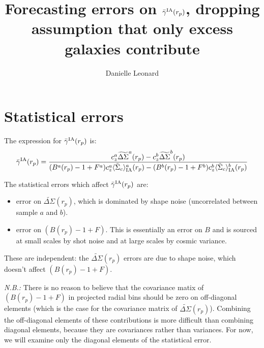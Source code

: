 \documentclass[onecolumn,amsmath,aps,fleqn, superscriptaddress]{revtex4}
\begin{document}
\title{Forecasting errors on $\bar{\gamma}^{\rm IA}(r_p)$, dropping assumption that only excess galaxies contribute}

\author{Danielle Leonard}

\maketitle

\section{Statistical errors}

The expression for $\bar{\gamma}^{\rm IA}(r_p)$ is:
\begin{equation}
\bar{\gamma}^{\rm IA}(r_p) = \frac{c_z^a \widetilde{\Delta\Sigma}^a(r_p) - c_z^b \widetilde{\Delta\Sigma}^b(r_p)}{(B^a(r_p)-1+F^a)c_z^a \langle \tilde{\Sigma}_c\rangle_{\rm IA}^a(r_p) -(B^b(r_p)-1+F^b)c_z^b \langle \tilde{\Sigma}_c\rangle_{\rm IA}^b(r_p)}
\label{gamma_sol_oct26}
\end{equation}

The statistical errors which affect $\bar{\gamma}^{\rm IA}(r_p)$ are:
\begin{itemize}
\item{error on $\widetilde{\Delta\Sigma}(r_p)$, which is dominated by shape noise (uncorrelated between sample $a$ and $b$).}
\item{error on $(B(r_p)-1+F)$. This is essentially an error on $B$ and is sourced at small scales by shot noise and at large scales by cosmic variance.}
\end{itemize}
These are independent: the $\widetilde{\Delta\Sigma}(r_p)$ errors are due to shape noise, which doesn't affect $(B(r_p)-1+F)$.

{\it N.B.:} There is no reason to believe that the covariance matix of $(B(r_p)-1+F)$ in projected radial bins should be zero on off-diagonal elements (which is the case for the covariance matrix of $\widetilde{\Delta\Sigma}(r_p)$). Combining the off-diagonal elements of these contributions is more difficult than combining diagonal elements, because they are covariances rather than variances. For now, we will examine only the diagonal elements of the statistical error. 
\end{document}
